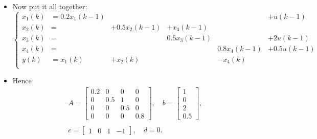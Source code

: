 \begin{frame}
\myPause
 \begin{itemize}[<+-| alert@+>]
 \item Now put it all together:
       \begin{displaymath}
        \left\{\begin{array}{rlllll}
         x_1(k) &= 0.2x_1(k-1) &              &              &              & +u(k-1)    \\
         x_2(k) &=             & +0.5x_2(k-1) & +x_3(k-1)                                \\
         x_3(k) &=             &              &  0.5x_3(k-1) &              & +2u(k-1)   \\
         x_4(k) &=             &              &              &  0.8x_4(k-1) & +0.5u(k-1) \\
         y(k)   &= x_1(k)      & +x_2(k)      &              & -x_4(k)                   \\
        \end{array}\right.
       \end{displaymath}
 \item Hence
       \begin{displaymath}
        \begin{array}{c}
         A = \begin{bmatrix}
              0.2 & 0   & 0   & 0   \\
              0   & 0.5 & 1   & 0   \\
              0   & 0   & 0.5 & 0   \\
              0   & 0   & 0   & 0.8
             \end{bmatrix}, \quad
         b = \begin{bmatrix} 1 \\ 0 \\ 2 \\ 0.5 \end{bmatrix}, \\ \\
         c = \begin{bmatrix} 1 & 0 & 1 & -1 \end{bmatrix}, \quad
         d = 0.
        \end{array}
       \end{displaymath}
 \end{itemize}
\end{frame}

